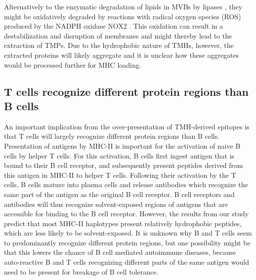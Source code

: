 Alternatively to the enzymatic degradation of lipids in MVBs by lipases \cite{sander2016lipase,gilleron2016lysosomal}, 
they might be oxidatively degraded by reactions with radical oxygen species (ROS) produced by the NADPH oxidase NOX2 \cite{dingjan2016lipid}. 
This oxidation can result in a destabilization and disruption of membranes \cite{dingjan2016lipid} 
and might thereby lead to the extraction of TMPs. 
Due to the hydrophobic nature of TMHs, 
however, the extracted proteins will likely aggregate 
and it is unclear how these aggregates would be processed further for MHC loading. 

\subsection{T cells recognize different protein regions than B cells}


An important implication from the over-presentation of TMH-derived epitopes is that T cells will largely recognize 
different protein regions than B cells. 
Presentation of antigens by MHC-II is important 
for the activation of naive B cells by helper T cells. 
For this activation, 
B cells first ingest antigen that is bound to their B cell receptor, 
and subsequently present peptides derived from this antigen in MHC-II 
to helper T cells. 
Following their activation by the T cells, 
B cells mature into plasma cells 
and release antibodies which recognize the same part of the antigen 
as the original B cell receptor. 
B cell receptors and antibodies will thus recognize solvent-exposed regions 
of antigens that are accessible for binding to the B cell receptor. 
However, the results from our study predict that most MHC-II haplotypes 
present relatively hydrophobic peptides,  which are less likely to be solvent-exposed. 
It is unknown why B and T cells seem to predominantly recognize 
different protein regions, but one possibility might be that 
this lowers the chance of B cell mediated autoimmune diseases, 
because auto-reactive B and T cells recognizing different parts 
of the same antigen would need to be present for breakage of B cell tolerance. 


